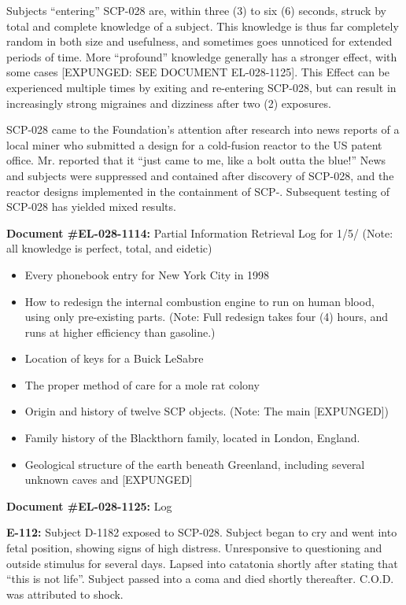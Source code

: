 Subjects “entering” SCP-028 are, within three (3) to six (6) seconds, struck by total and complete knowledge of a subject. This knowledge is thus far completely random in both size and usefulness, and sometimes goes unnoticed for extended periods of time. More “profound” knowledge generally has a stronger effect, with some cases [EXPUNGED: SEE DOCUMENT EL-028-1125]. This Effect can be experienced multiple times by exiting and re-entering SCP-028, but can result in increasingly strong migraines and dizziness after two (2) exposures.

SCP-028 came to the Foundation’s attention after research into news reports of a local miner who submitted a design for a cold-fusion reactor to the US patent office. Mr.  reported that it “just came to me, like a bolt outta the blue!” News and subjects were suppressed and contained after discovery of SCP-028, and the reactor designs implemented in the containment of SCP-. Subsequent testing of SCP-028 has yielded mixed results.

\textbf{Document \#EL-028-1114:} Partial Information Retrieval Log for 1/5/ (Note: all knowledge is perfect, total, and eidetic)
\begin{itemize}
\item Every phonebook entry for New York City in 1998
\item How to redesign the internal combustion engine to run on human blood, using only pre-existing parts. (Note: Full redesign takes four (4) hours, and runs at higher efficiency than gasoline.)
\item Location of keys for a Buick LeSabre
\item The proper method of care for a mole rat colony
\item Origin and history of twelve SCP objects. (Note: The main [EXPUNGED])
\item Family history of the Blackthorn family, located in London, England.
\item Geological structure of the earth beneath Greenland, including several unknown caves and [EXPUNGED]
\end{itemize}

\textbf{Document \#EL-028-1125:} Log

\textbf{E-112:} Subject D-1182 exposed to SCP-028. Subject began to cry and went into fetal position, showing signs of high distress. Unresponsive to questioning and outside stimulus for several days. Lapsed into catatonia shortly after stating that “this is not life”. Subject passed into a coma and died shortly thereafter. C.O.D. was attributed to shock.

